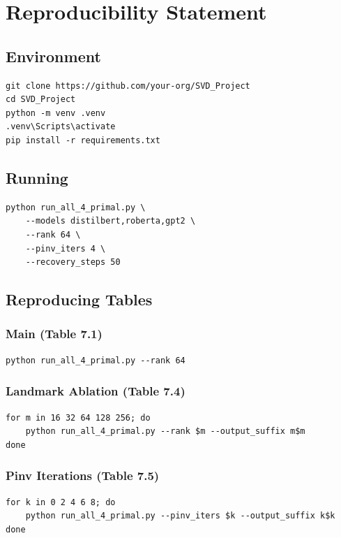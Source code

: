 
\section{Reproducibility Statement}

\subsection{Environment}

\begin{lstlisting}
git clone https://github.com/your-org/SVD_Project
cd SVD_Project
python -m venv .venv
.venv\Scripts\activate
pip install -r requirements.txt
\end{lstlisting}

\subsection{Running}

\begin{lstlisting}
python run_all_4_primal.py \
    --models distilbert,roberta,gpt2 \
    --rank 64 \
    --pinv_iters 4 \
    --recovery_steps 50
\end{lstlisting}

\subsection{Reproducing Tables}

\subsubsection{Main (Table 7.1)}
\begin{lstlisting}
python run_all_4_primal.py --rank 64
\end{lstlisting}

\subsubsection{Landmark Ablation (Table 7.4)}
\begin{lstlisting}
for m in 16 32 64 128 256; do
    python run_all_4_primal.py --rank $m --output_suffix m$m
done
\end{lstlisting}

\subsubsection{Pinv Iterations (Table 7.5)}
\begin{lstlisting}
for k in 0 2 4 6 8; do
    python run_all_4_primal.py --pinv_iters $k --output_suffix k$k
done
\end{lstlisting}

